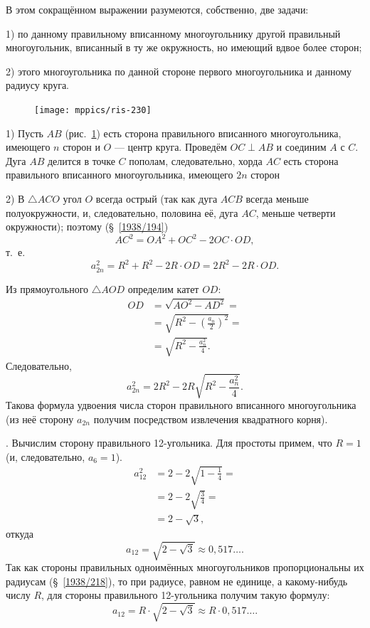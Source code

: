 \documentclass[oneside]{book}
\begin{document}
В этом сокращённом выражении разумеются, %
собственно, две задачи:

1) по данному правильному вписанному многоугольнику  другой правильный многоугольник, вписанный в ту же окружность, но имеющий вдвое более сторон;

2)  этого многоугольника по данной стороне первого многоугольника и данному радиусу круга.

\begin{figure}
\centering
\texttt{[image: mppics/ris-230]}
\caption{}\label{1938/ris-230}
\end{figure}

1) Пусть $AB$ (рис.~\ref{1938/ris-230}) есть сторона правильного вписанного многоугольника, имеющего $n$ сторон и $O$ — центр круга.
Проведём $OC\perp AB$ и соединим $A$ с $C$.
Дуга $AB$ делится в точке $C$ пополам, следовательно, хорда $AC$ есть сторона правильного вписанного многоугольника, имеющего $2n$ сторон

2) В $\triangle ACO$ угол $O$ всегда острый (так как дуга $ACB$ всегда меньше полуокружности, и, следовательно, половина её, дуга $AC$, меньше четверти окружности);
поэтому (§~\ref{1938/194})
\[AC^2=OA^2+OC^2-2OC\cdot OD,\]
т.~е.
\[a_{2n}^2=R^2+R^2-2R\cdot OD=2R^2-2R\cdot OD.\]

Из прямоугольного $\triangle AOD$ определим катет $OD$:
\begin{align*}
OD&=\sqrt{AO^2-AD^2}=
\\
&=\sqrt{R^2-(\tfrac{a_n}2)^2}=
\\
&=\sqrt{R^2-\tfrac{a_n^2}4}.
\end{align*}
Следовательно,
\[a_{2n}^2=2R^2-2R\sqrt{R^2-\frac{a_n^2}4}.\]
Такова формула удвоения числа сторон правильного вписанного многоугольника (из неё сторону $a_{2n}$ получим посредством извлечения квадратного корня).

.
Вычислим сторону правильного 12-угольника.
Для простоты примем, что $R=1$ (и, следовательно, $a_6 = 1$).
\begin{align*}
a_{12}^2&=2-2\sqrt{1-\tfrac14}=
\\
&=2-2\sqrt{\tfrac34}=
\\
&=2-\sqrt{3},
\end{align*}
откуда
\[a_{12}=\sqrt{2-\sqrt3}\approx 0{,}517\dots.\]
Так как стороны правильных одноимённых многоугольников пропорциональны их радиусам (§~\ref{1938/218}), то при радиусе, равном не единице, а какому-нибудь числу $R$, для стороны правильного 12-угольника получим такую формулу:
\[a_{12}=R\cdot \sqrt{2-\sqrt3}\approx R\cdot 0{,}517\dots.\]
\end{document}
